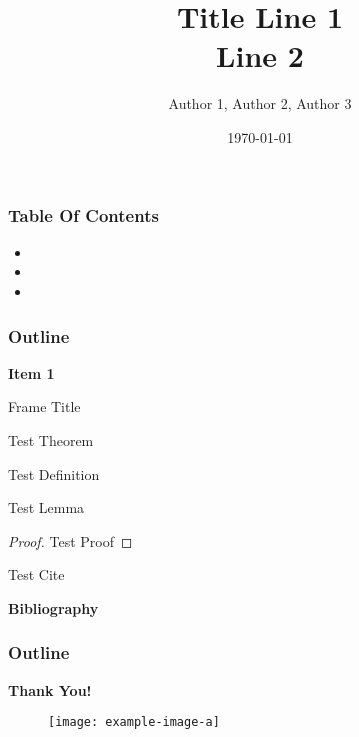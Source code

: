 \documentclass[10pt, usenames,dvipsnames, aspectratio=169]{beamer}
\title[Short Title]{\textbf{Title Line 1 \\Line 2}}
\author[Author 1 et al.]{Author 1\inst{1}, Author 2\inst{1}, Author 3\inst{2}}
\institute[shortinst]{\inst{1} Afil 1 \and \inst{2} 
Afil 2}
\date{\today}
\begin{document}
\begin{frame}
  \maketitle
\end{frame}



\begin{frame}
\frametitle{Table Of Contents}
\begin{itemize}
    \item 
    \item 
    \item
\end{itemize}
\end{frame}



\begin{frame}
\frametitle{Outline}
\begin{center}
{\Large \textbf{Item 1}}
\end{center}
\end{frame}

\begin{frame}{Frame Title}
\begin{theorem}[Theorem 1]
    Test Theorem
\end{theorem}

\begin{definition}[Definition 1]
    Test Definition
\end{definition}

\begin{lemma}[Lemma 1]
    Test Lemma
\end{lemma}

\begin{proof}
    Test Proof
\end{proof}

\vs

Test Cite \cite{boyles2020transportation}

\end{frame}

\begin{frame}{\textbf{Bibliography}}
\nocite{*}
{\normalsize \printbibliography[heading=none]}
\end{frame}

\begin{frame}
\frametitle{Outline}
\begin{center}
{\Large \textbf{Thank You! \\ \vs {}}}
\begin{figure}
    \centering
    \texttt{[image: example-image-a]}
    \caption{}
    \label{fig:enter-label}
\end{figure}
\end{center}

\footnotesize{\url{}}
\end{frame}
\end{document}

